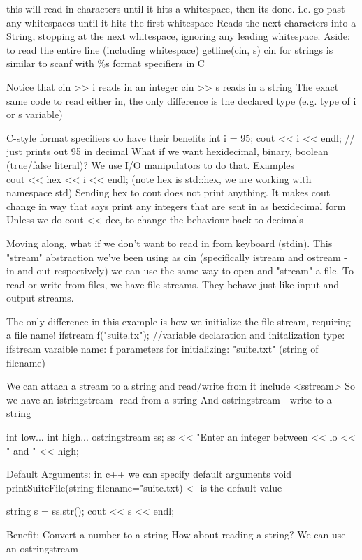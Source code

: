 \documentclass[12pt,oneside,fleqn]{book}
\begin{document}
this will read in characters until it hits a whitespace, then its done.
i.e. go past any whitespaces until it hits the first whitespace
Reads the next characters into a String, stopping at the next whitespace, ignoring any leading whitespace.
Aside: to read the entire line (including whitespace) getline(cin, s)
cin for strings is similar to scanf with \%s format specifiers in C

Notice that 
cin >> i reads in an integer
cin >> s reads in a string
The exact same code to read either in, the only difference is the declared type (e.g. type of i or s variable)

C-style format specifiers do have their benefits
int i = 95;
cout << i << endl; // just prints out 95 in decimal
What if we want hexidecimal, binary, boolean (true/false literal)?
We use I/O manipulators to do that. Examples\\
cout << hex << i << endl; (note hex is std::hex, we are working with namespace std)
Sending hex to cout does not print anything. It makes cout change in  way that says print any integers that are sent in as hexidecimal form
Unless we do cout << dec, to change the behaviour back to decimals

Moving along, what if we don't want to read in from keyboard (stdin).
This "stream" abstraction we've been using as cin (specifically istream and ostream - in and out respectively) we can use the same way to open and "stream" a file.
To read or write from files, we have file streams. They behave just like input and output streams.

The only difference in this example is how we initialize the file stream, requiring a file name!
ifstream f("suite.tx"); //variable declaration and initalization
type: ifstream
varaible name: f
parameters for initializing: "suite.txt" (string of filename)

We can attach a stream to a string and read/write from it
include <sstream>
So we have an istringstream -read from a string
And ostringstream - write to a string

int low...
int high...
ostringstream ss;
ss << "Enter an integer between << lo << " and " << high;

Default Arguments:
in c++ we can specify default arguments
void printSuiteFile(string filename="suite.txt) <- is the default value

string s = ss.str();
cout << s << endl;

Benefit: Convert a number to a string
How about reading a string?
We can use an ostringstream
\end{document}
